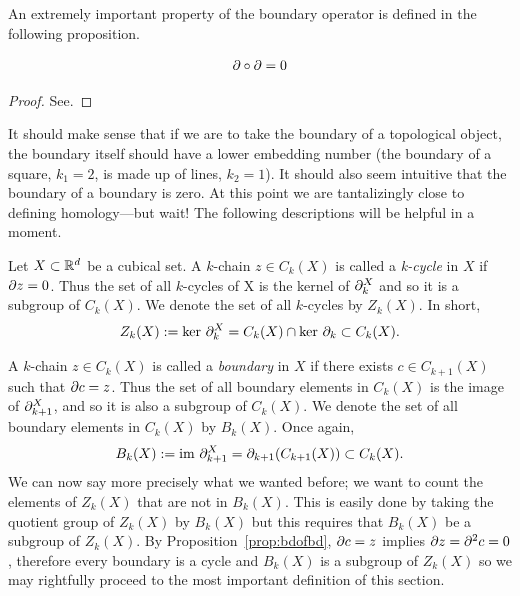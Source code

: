 An extremely important property of the boundary operator is defined in the following proposition.

\begin{prop} \label{prop:bdofbd}
	$$\partial \circ \partial = 0$$
\end{prop}

\begin{proof}
	See.
\end{proof}

It should make sense that if we are to take the boundary of a topological object, the boundary itself should have a lower embedding number (the boundary of a square, $k_1=2$, is made up of lines, $k_2=1$). It should also seem intuitive that the boundary of a boundary is zero. At this point we are tantalizingly close to defining homology---but wait! The following descriptions will be helpful in a moment.

\begin{defn}
	Let $X \subset \mathbb{R}^d$ be a cubical set. A $k$-chain $z \in C_k(X)$ is called a \textit{k-cycle} in $X$ if $\partial z = 0$. Thus the set of all $k$-cycles of X is the kernel of $\partial_k^X$ and so it is a subgroup of $C_k(X)$. We denote the set of all $k$-cycles by $Z_k(X)$. In short,
	\begin{align}
		Z_k(X) := \text{ker } \partial_k^X = C_k(X) \cap \text{ker } \partial_k \subset C_k(X).
	\end{align}
\end{defn}

%
A $k$-chain $z \in C_k(X)$ is called a \textit{boundary} in $X$ if there exists $c \in C_{k+1}(X)$ such that $\partial c = z$. Thus the set of all boundary elements in $C_k(X)$ is the image of $\partial_{k+1}^X$, and so it is also a subgroup of $C_k(X)$. We denote the set of all boundary elements in $C_k(X)$ by $B_k(X)$. Once again,
%
\begin{align}
	B_k(X) := \text{im } \partial_{k+1}^X = \partial_{k+1} (C_{k+1}(X)) \subset C_k(X).
\end{align}
%
We can now say more precisely what we wanted before; we want to count the elements of $Z_k(X)$ that are not in $B_k(X)$. This is easily done by taking the quotient group of $Z_k(X)$ by $B_k(X)$ but this requires that $B_k(X)$ be a subgroup of $Z_k(X)$. By Proposition~\ref{prop:bdofbd}, $\partial c = z$ implies $\partial z = \partial^2 c = 0$, therefore every boundary is a cycle and $B_k(X)$ is a subgroup of $Z_k(X)$ so we may rightfully proceed to the most important definition of this section.

